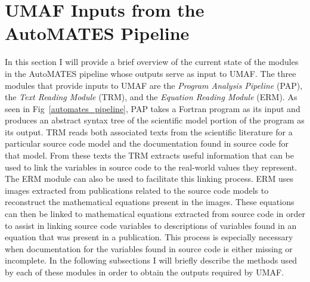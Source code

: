 \section{UMAF Inputs from the AutoMATES Pipeline\label{sec:umaf_inputs}}
In this section I will provide a brief overview of the current state of the modules in the AutoMATES pipeline whose outputs serve as input to UMAF.
The three modules that provide inputs to UMAF are the \textit{Program Analysis Pipeline} (PAP), the \textit{Text Reading Module} (TRM), and the \textit{Equation Reading Module} (ERM). As seen in Fig~\ref{automates_pipeline}, PAP takes a Fortran program as its input and produces an abstract syntax tree of the scientific model portion of the program as its output.
TRM reads both associated texts from the scientific literature for a particular source code model and the documentation found in source code for that model.
From these texts the TRM extracts useful information that can be used to link the variables in source code to the real-world values they represent.
The ERM module can also be used to facilitate this linking process.
ERM uses images extracted from publications related to the source code models to reconstruct the mathematical equations present in the images.
These equations can then be linked to mathematical equations extracted from source code in order to assist in linking source code variables to descriptions of variables found in an equation that was present in a publication.
This process is especially necessary when documentation for the variables found in source code is either missing or incomplete.
In the following subsections I will briefly describe the methods used by each of these modules in order to obtain the outputs required by UMAF.

